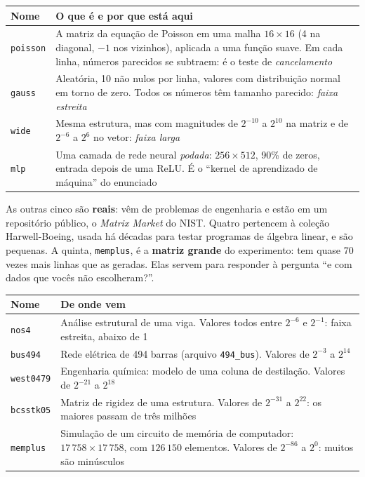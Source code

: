 \documentclass[11pt,a4paper]{article}
\newcommand{\code}[1]{\texttt{#1}}
\begin{document}
\begin{center}
\begin{tabularx}{\linewidth}{lX}
\toprule
Nome & O que é e por que está aqui \\
\midrule
\code{poisson} & A matriz da equação de Poisson em uma malha $16\times16$ (4 na diagonal, $-1$ nos
  vizinhos), aplicada a uma função suave. Em cada linha, números parecidos se subtraem: é o teste de
  \emph{cancelamento} \\
\code{gauss} & Aleatória, 10 não nulos por linha, valores com distribuição normal em torno de zero. Todos
  os números têm tamanho parecido: \emph{faixa estreita} \\
\code{wide} & Mesma estrutura, mas com magnitudes de $2^{-10}$ a $2^{10}$ na matriz e de $2^{-6}$ a
  $2^{6}$ no vetor: \emph{faixa larga} \\
\code{mlp} & Uma camada de rede neural \emph{podada}: $256\times512$, 90\% de zeros, entrada depois de uma
  ReLU. É o ``kernel de aprendizado de máquina'' do enunciado \\
\bottomrule
\end{tabularx}
\end{center}

As outras cinco são \textbf{reais}: vêm de problemas de engenharia e estão em um repositório público, o
\emph{Matrix Market} do NIST. Quatro pertencem à coleção Harwell-Boeing, usada há décadas para testar
programas de álgebra linear, e são pequenas. A quinta, \code{memplus}, é a \textbf{matriz grande} do
experimento: tem quase 70 vezes mais linhas que as geradas. Elas servem para responder à pergunta ``e com dados que vocês não escolheram?''.

\begin{center}
\begin{tabularx}{\linewidth}{lX}
\toprule
Nome & De onde vem \\
\midrule
\code{nos4} & Análise estrutural de uma viga. Valores todos entre $2^{-6}$ e $2^{-1}$: faixa estreita,
  abaixo de 1 \\
\code{bus494} & Rede elétrica de 494 barras (arquivo \code{494\_bus}). Valores de $2^{-3}$ a $2^{14}$ \\
\code{west0479} & Engenharia química: modelo de uma coluna de destilação. Valores de $2^{-21}$ a
  $2^{18}$ \\
\code{bcsstk05} & Matriz de rigidez de uma estrutura. Valores de $2^{-31}$ a $2^{22}$: os maiores passam
  de três milhões \\
\code{memplus} & Simulação de um circuito de memória de computador: $17\,758\times17\,758$, com
  $126\,150$ elementos. Valores de $2^{-86}$ a $2^{0}$: muitos são minúsculos \\
\bottomrule
\end{tabularx}
\end{center}
\end{document}
